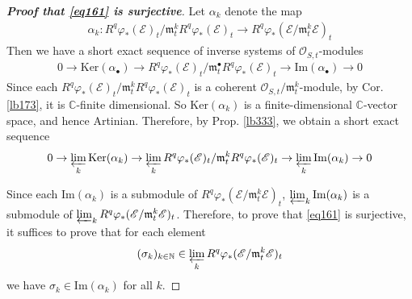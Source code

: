 \documentclass[12pt,b5paper,notitlepage]{report}
\theoremstyle{definition}
\theoremstyle{plain}
\newcommand{\scr}{\mathscr}
\newcommand{\blt}{\bullet}
\newcommand{\Cbb}{\mathbb C}
\newcommand{\Nbb}{\mathbb N}
\newcommand{\Ker}{\mathrm{Ker}}
\newcommand{\Imag}{\mathrm{Im}}
\newcommand{\mk}{\mathfrak m}
\numberwithin{equation}{section}
\begin{document}
\begin{proof}[\textbf{Proof that \eqref{eq161} is surjective}]
Let $\alpha_k$ denote the map
\begin{align*}
\alpha_k: R^q\varphi_*(\scr E)_t/\mk_t^kR^q\varphi_*(\scr E)_t\rightarrow R^q\varphi_*(\scr E/\mk_t^k\scr E)_t
\end{align*}
Then we have a short exact sequence of inverse systems of $\scr O_{S,t}$-modules
\begin{align*}
0\rightarrow \Ker(\alpha_\blt)\rightarrow R^q\varphi_*(\scr E)_t/\mk_t^\blt R^q\varphi_*(\scr E)_t\rightarrow\Imag(\alpha_\blt)\rightarrow 0
\end{align*}
Since each $R^q\varphi_*(\scr E)_t/\mk_t^kR^q\varphi_*(\scr E)_t$ is a coherent $\scr O_{S,t}/\mk_t^k$-module, by Cor. \ref{lb173}, it is $\Cbb$-finite dimensional. So $\Ker(\alpha_k)$ is a finite-dimensional $\Cbb$-vector space, and hence Artinian. Therefore, by Prop. \ref{lb333}, we obtain a short exact sequence
\begin{align*}
0\rightarrow \varprojlim_k\Ker(\alpha_k)\rightarrow \varprojlim_k R^q\varphi_*(\scr E)_t/\mk_t^k R^q\varphi_*(\scr E)_t\rightarrow\varprojlim_k\Imag(\alpha_k)\rightarrow 0
\end{align*}

Since each $\Imag(\alpha_k)$ is a submodule of $R^q\varphi_*(\scr E/\mk_t^k\scr E)_t$, $\varprojlim_k\Imag(\alpha_k)$ is a submodule of $\varprojlim_kR^q\varphi_*(\scr E/\mk_t^k\scr E)_t$. Therefore, to prove that \eqref{eq161} is surjective, it suffices to prove that for each element
\begin{align*}
(\sigma_k)_{k\in\Nbb}\in  \varprojlim_kR^q\varphi_*(\scr E/\mk_t^k\scr E)_t
\end{align*}
we have $\sigma_k\in\Imag(\alpha_k)$ for all $k$.


\end{proof}
\end{document}

